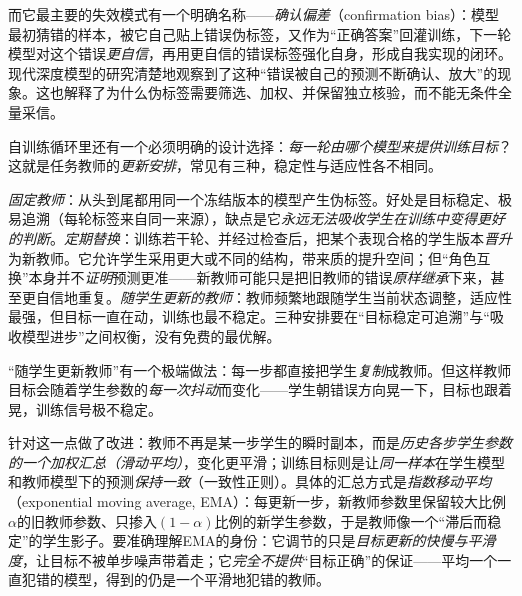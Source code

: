 而它最主要的失效模式有一个明确名称——\emph{确认偏差}（confirmation bias）：模型最初猜错的样本，被它自己贴上错误伪标签，又作为“正确答案”回灌训练，下一轮模型对这个错误\emph{更自信}，再用更自信的错误标签强化自身，形成自我实现的闭环。现代深度模型的研究清楚地观察到了这种“错误被自己的预测不断确认、放大”的现象。这也解释了为什么伪标签需要筛选、加权、并保留独立核验，而不能无条件全量采信。

自训练循环里还有一个必须明确的设计选择：\emph{每一轮由哪个模型来提供训练目标}？这就是任务教师的\emph{更新安排}，常见有三种，稳定性与适应性各不相同。

\emph{固定教师}：从头到尾都用同一个冻结版本的模型产生伪标签。好处是目标稳定、极易追溯（每轮标签来自同一来源），缺点是它\emph{永远无法吸收学生在训练中变得更好的判断}。\emph{定期替换}：训练若干轮、并经过检查后，把某个表现合格的学生版本\emph{晋升}为新教师。它允许学生采用更大或不同的结构，带来质的提升空间；但“角色互换”本身并不\emph{证明}预测更准——新教师可能只是把旧教师的错误\emph{原样继承}下来，甚至更自信地重复。\emph{随学生更新的教师}：教师频繁地跟随学生当前状态调整，适应性最强，但目标一直在动，训练也最不稳定。三种安排要在“目标稳定可追溯”与“吸收模型进步”之间权衡，没有免费的最优解。

“随学生更新教师”有一个极端做法：每一步都直接把学生\emph{复制}成教师。但这样教师目标会随着学生参数的\emph{每一次抖动}而变化——学生朝错误方向晃一下，目标也跟着晃，训练信号极不稳定。

针对这一点做了改进：教师不再是某一步学生的瞬时副本，而是\emph{历史各步学生参数的一个加权汇总（滑动平均）}，变化更平滑；训练目标则是让\emph{同一样本}在学生模型和教师模型下的预测\emph{保持一致}（一致性正则）。具体的汇总方式是\emph{指数移动平均}（exponential moving average, EMA）：每更新一步，新教师参数里保留较大比例$\alpha$的旧教师参数、只掺入$(1-\alpha)$比例的新学生参数，于是教师像一个“滞后而稳定”的学生影子。要准确理解EMA的身份：它调节的只是\emph{目标更新的快慢与平滑度}，让目标不被单步噪声带着走；它\emph{完全不提供}“目标正确”的保证——平均一个一直犯错的模型，得到的仍是一个平滑地犯错的教师。

